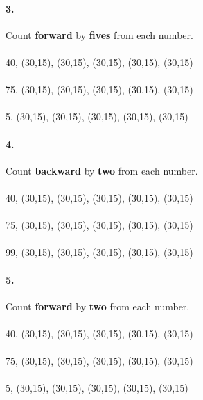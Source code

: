 \documentclass[12pt]{article}
\begin{document}
\paragraph{3.}
Count \textbf{forward} by \textbf{fives} from each number. \\
\\
40, \framebox(30,15){}, \framebox(30,15){}, \framebox(30,15){}, \framebox(30,15){}, \framebox(30,15){}
\\
\\
75, \framebox(30,15){}, \framebox(30,15){}, \framebox(30,15){}, \framebox(30,15){}, \framebox(30,15){}
\\
\\
5, \framebox(30,15){}, \framebox(30,15){}, \framebox(30,15){}, \framebox(30,15){}, \framebox(30,15){}

\bigskip

\paragraph{4.}
Count \textbf{backward} by \textbf{two} from each number. \\
\\
40, \framebox(30,15){}, \framebox(30,15){}, \framebox(30,15){}, \framebox(30,15){}, \framebox(30,15){}
\\
\\
75, \framebox(30,15){}, \framebox(30,15){}, \framebox(30,15){}, \framebox(30,15){}, \framebox(30,15){}
\\
\\
99, \framebox(30,15){}, \framebox(30,15){}, \framebox(30,15){}, \framebox(30,15){}, \framebox(30,15){}

\bigskip

\paragraph{5.}
Count \textbf{forward} by \textbf{two} from each number. \\
\\
40, \framebox(30,15){}, \framebox(30,15){}, \framebox(30,15){}, \framebox(30,15){}, \framebox(30,15){}
\\
\\
75, \framebox(30,15){}, \framebox(30,15){}, \framebox(30,15){}, \framebox(30,15){}, \framebox(30,15){}
\\
\\
5, \framebox(30,15){}, \framebox(30,15){}, \framebox(30,15){}, \framebox(30,15){}, \framebox(30,15){}
\end{document}
